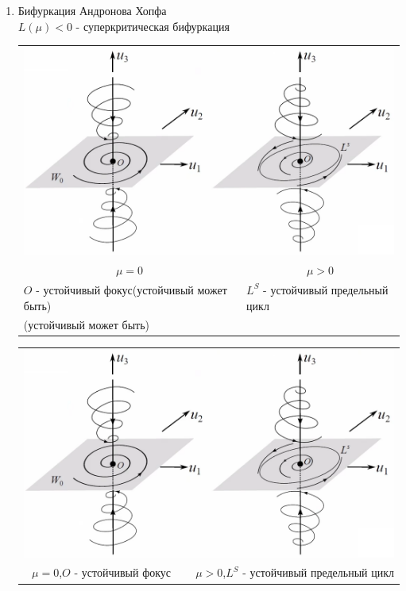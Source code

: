 \begin{multicols*}{2}
\begin{enumerate}
			\item Бифуркация Андронова Хопфа \\
			$L(\mu)<0$ - суперкритическая бифуркация \\
			\begin{tabular*}{0.5\textwidth}{@{\extracolsep{\fill}}ll}
				\multicolumn{2}{l}{\includegraphics[width=0.9\linewidth]{tk_img/14_5.png}} \\
				\multicolumn{1}{c}{$\mu=0$} & \multicolumn{1}{c}{$\mu>0$} \\
				$O$ - устойчивый фокус(устойчивый может быть) & $L^S$ - устойчивый предельный цикл \\
				(устойчивый может быть) 
			\end{tabular*}

			\begin{tabular}{cr}
				\multicolumn{2}{c}{\includegraphics[width=0.9\linewidth]{tk_img/14_5.png}} \\
				$\mu=0$,\quad $O$ - устойчивый фокус & $\mu>0$,\quad $L^S$ - устойчивый предельный цикл\\
			\end{tabular}
			

\end{enumerate}
\end{multicols*}
